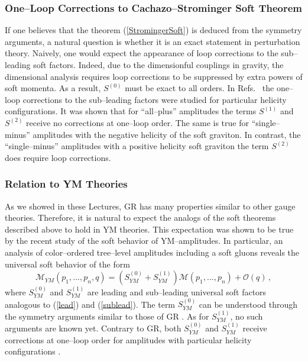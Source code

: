 \documentclass[12pt]{article}
\newcommand{\be}{\begin{equation}}
\newcommand{\ee}{\end{equation}}
\newcommand{\M}{\mathcal{M}}
\begin{document}
\subsubsection{One--Loop Corrections to Cachazo--Strominger Soft Theorem}

If one believes that the theorem (\ref{StromingerSoft}) is deduced from the symmetry arguments, a natural question is whether it is an exact statement in perturbation theory.
Naively, one would expect the appearance of loop corrections to the sub--leading soft factors.
Indeed, due to the dimensionful couplings in gravity, the dimensional analysis requires loop corrections to be suppressed by extra powers of soft momenta. As a result, $S^{(0)}$ must be exact to all orders. In Refs.~\cite{Bern:2014oka,He:2014bga} the one--loop corrections to the sub--leading factors were studied for particular helicity configurations. It was shown that for ``all--plus'' amplitudes the terms $S^{(1)}$ and $S^{(2)}$ receive no corrections at one--loop order.
The same is true for ``single--minus'' amplitudes with the negative helicity of the soft graviton.
In contrast, the ``single--minus'' amplitudes with a positive helicity soft graviton the term $S^{(2)}$ does
require loop corrections.

\subsubsection{Relation to YM Theories}

As we showed  in these Lectures, GR has many properties similar to other gauge theories.
Therefore, it is natural to expect the analogs of the soft theorems described above to hold in YM theories.
This expectation was shown to be true by the recent study of the soft behavior of YM--amplitudes.
In particular, an analysis of color--ordered tree--level amplitudes including a soft gluons
reveals the universal soft behavior of the form \cite{Casali:2014xpa}
\be
\M_{YM}(p_1,...,p_n,q)=(S^{(0)}_{YM}+S^{(1)}_{YM})\M(p_1,...,p_n)+\mathcal{O}(q)\,,
\ee
where $S^{(0)}_{YM}$ and $S^{(1)}_{YM}$ are leading and sub--leading universal soft factors analogous to (\ref{lead}) and (\ref{sublead}). The term $S^{(0)}_{YM}$ can be understood through the symmetry arguments similar to those of GR \cite{Strominger:2013lka}. As for $S^{(1)}_{YM}$, no such arguments are known yet. Contrary to GR, both $S^{(0)}_{YM}$ and $S^{(1)}_{YM}$ receive corrections at one--loop order for
amplitudes with particular helicity configurations \cite{He:2014bga}.
\end{document}
